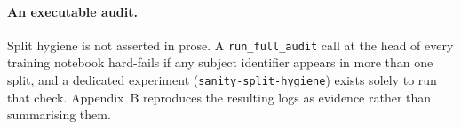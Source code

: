 \paragraph{An executable audit.} Split hygiene is not asserted in prose. A
\texttt{run\_full\_audit} call at the head of every training notebook hard-fails if any
subject identifier appears in more than one split, and a dedicated experiment
(\texttt{sanity-split-hygiene}) exists solely to run that check. Appendix~B reproduces the
resulting logs as evidence rather than summarising them.

